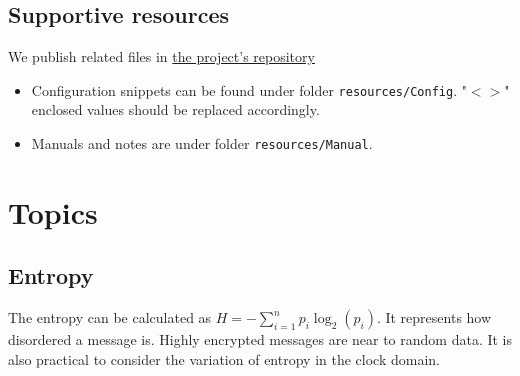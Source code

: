 \subsection{Supportive resources}
\begin{frame}
    We publish related files in \href{https://gitlab.lrz.de/tuinh09/teaching/scni/repos/2024ws-hn/u157}{the project's repository}
    \begin{itemize}
        \item Configuration snippets can be found under folder \texttt{resources/Config}. "$<>$" enclosed values should be replaced accordingly.
        \item Manuals and notes are under folder \texttt{resources/Manual}.
    \end{itemize}
    
\end{frame}

\section{Topics}
\subsection{Entropy}
\begin{frame}
    The entropy can be calculated as $H = -\sum_{i=1}^{n} p_i \log_2(p_i)$. It represents how disordered a message is. Highly encrypted messages are near to random data.
    It is also practical to consider the variation of entropy in the clock domain.
    \begin{table}[h]
    \centering
    \caption{Average entropy for common protocols}
    \end{table}
\end{frame}

